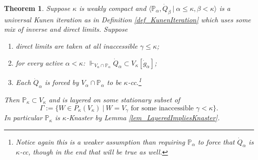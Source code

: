 \documentclass{amsart}
\newtheorem{theorem}{Theorem}
\begin{document}
\begin{theorem}\label{thm_WeakCompact_Kunen_MainThm_Precise}
Suppose $\kappa$ is weakly compact and $\langle \mathbb{P}_\alpha, \dot{Q}_\beta \ | \ \alpha \le \kappa, \beta < \kappa \rangle$ is a universal Kunen iteration as in Definition \ref{def_KunenIteration} which uses some mix of inverse and direct limits.  Suppose
\begin{enumerate}
 \item direct limits are taken at all inaccessible $\gamma \le \kappa$;
 \item for every active $\alpha < \kappa$:  $\Vdash_{V_\alpha \cap \mathbb{P}_\alpha} \dot{Q}_\alpha \subset V_\kappa[\dot{g}_\alpha]$;
 \item\label{item_KappaCCForcedByInner} Each $\dot{Q}_\alpha$ is forced by $V_\alpha \cap \mathbb{P}_\alpha$ to be $\kappa$-cc.\footnote{Notice again this is a weaker assumption than requiring $\mathbb{P}_\alpha$ to force that $\dot{Q}_\alpha$ is $\kappa$-cc, though in the end that will be true as well.}
\end{enumerate}
Then $\mathbb{P}_\kappa \subset V_\kappa$ and is layered on some stationary subset of
\begin{equation*}
\Gamma:= \{ W \in P_\kappa(V_\kappa) \ | \ W = V_\gamma \text{ for some inaccessible } \gamma < \kappa   \}.
\end{equation*}
In particular $\mathbb{P}_\kappa$ is $\kappa$-Knaster by Lemma \ref{lem_LayeredImpliesKnaster}.
\end{theorem}
\end{document}
